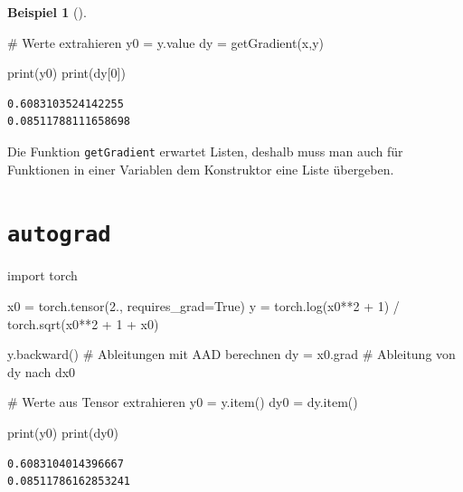 \documentclass[
  a4paper,
  DIV=11]{scrreprt}
\newenvironment{Shaded}{\begin{snugshade}}{\end{snugshade}}
\newcommand{\BuiltInTok}[1]{\textcolor[rgb]{0.00,0.23,0.31}{#1}}
\newcommand{\CommentTok}[1]{\textcolor[rgb]{0.37,0.37,0.37}{#1}}
\newcommand{\DecValTok}[1]{\textcolor[rgb]{0.68,0.00,0.00}{#1}}
\newcommand{\FloatTok}[1]{\textcolor[rgb]{0.68,0.00,0.00}{#1}}
\newcommand{\ImportTok}[1]{\textcolor[rgb]{0.00,0.46,0.62}{#1}}
\newcommand{\NormalTok}[1]{\textcolor[rgb]{0.00,0.23,0.31}{#1}}
\newcommand{\OperatorTok}[1]{\textcolor[rgb]{0.37,0.37,0.37}{#1}}
\newcommand{\VariableTok}[1]{\textcolor[rgb]{0.07,0.07,0.07}{#1}}
\theoremstyle{definition}
\theoremstyle{definition}
\newtheorem{example}{Beispiel}[chapter]
\theoremstyle{remark}
\begin{document}
\begin{example}[]
\begin{Shaded}
\begin{Highlighting}[]
\CommentTok{\# Werte extrahieren}
\NormalTok{y0 }\OperatorTok{=}\NormalTok{ y.value}
\NormalTok{dy }\OperatorTok{=}\NormalTok{ getGradient(x,y)}

\BuiltInTok{print}\NormalTok{(y0)}
\BuiltInTok{print}\NormalTok{(dy[}\DecValTok{0}\NormalTok{])}
\end{Highlighting}
\end{Shaded}

\begin{verbatim}
0.6083103524142255
0.08511788111658698
\end{verbatim}

Die Funktion \texttt{getGradient} erwartet Listen, deshalb muss man auch
für Funktionen in einer Variablen dem Konstruktor eine Liste übergeben.

\section{\texorpdfstring{\texttt{autograd}}{autograd}}

\begin{Shaded}
\begin{Highlighting}[]
\ImportTok{import}\NormalTok{ torch}

\NormalTok{x0 }\OperatorTok{=}\NormalTok{ torch.tensor(}\FloatTok{2.}\NormalTok{, requires\_grad}\OperatorTok{=}\VariableTok{True}\NormalTok{)}
\NormalTok{y }\OperatorTok{=}\NormalTok{ torch.log(x0}\OperatorTok{**}\DecValTok{2} \OperatorTok{+} \DecValTok{1}\NormalTok{) }\OperatorTok{/}\NormalTok{ torch.sqrt(x0}\OperatorTok{**}\DecValTok{2} \OperatorTok{+} \DecValTok{1} \OperatorTok{+}\NormalTok{ x0)}

\NormalTok{y.backward() }\CommentTok{\# Ableitungen mit AAD berechnen}
\NormalTok{dy }\OperatorTok{=}\NormalTok{ x0.grad }\CommentTok{\# Ableitung von dy nach dx0}

\CommentTok{\# Werte aus Tensor extrahieren}
\NormalTok{y0 }\OperatorTok{=}\NormalTok{ y.item()}
\NormalTok{dy0 }\OperatorTok{=}\NormalTok{ dy.item()}

\BuiltInTok{print}\NormalTok{(y0)}
\BuiltInTok{print}\NormalTok{(dy0)}
\end{Highlighting}
\end{Shaded}

\begin{verbatim}
0.6083104014396667
0.08511786162853241
\end{verbatim}


\end{example}
\end{document}

